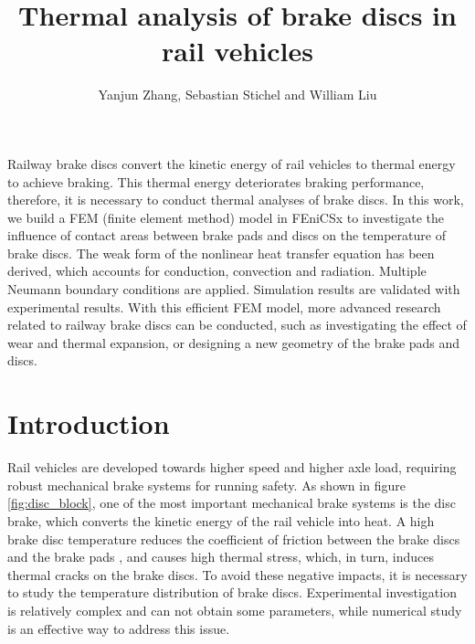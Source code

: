 \graphicspath{{chapters/zhang/graphics/}}


\title{Thermal analysis of brake discs in rail vehicles}

\author{Yanjun Zhang, Sebastian Stichel and William Liu}


\maketitle

\abstract{}
Railway brake discs convert the kinetic energy of rail vehicles to thermal energy to achieve braking. This thermal energy deteriorates braking performance, therefore, it is necessary to conduct thermal analyses of brake discs. In this work, we build a FEM (finite element method) model in FEniCSx to investigate the influence of contact areas between brake pads and discs on the temperature of brake discs. The weak form of the nonlinear heat transfer equation has been derived, which accounts for conduction, convection and radiation. Multiple Neumann boundary conditions are applied. Simulation results are validated with experimental results. With this efficient FEM model, more advanced research related to railway brake discs can be conducted, such as investigating the effect of wear and thermal expansion, or designing a new geometry of the brake pads and discs.

\section*{Introduction}
Rail vehicles are developed towards higher speed and higher axle load, requiring robust mechanical brake systems for running safety. As shown in figure \ref{fig:disc_block}, one of the most important mechanical brake systems is the disc brake, which converts the kinetic energy of the rail vehicle into heat. A high brake disc temperature reduces the coefficient of friction between the brake discs and the brake pads \cite{Saffar2010}, and causes high thermal stress, which, in turn, induces thermal cracks on the brake discs. To avoid these negative impacts, it is necessary to study the temperature distribution of brake discs. Experimental investigation is relatively complex and can not obtain some parameters, while numerical study is an effective way to address this issue.

